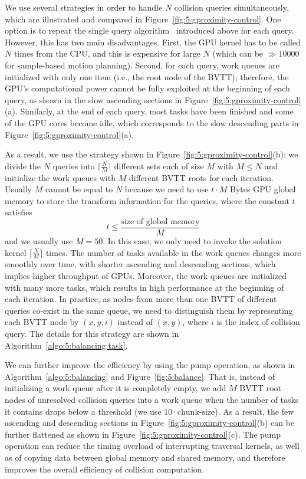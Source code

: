 We use several strategies in order to handle $N$ collision queries simultaneously, which are illustrated and compared in Figure~\ref{fig:5:gproximity-control}. One option is to repeat the single query algorithm~\cite{Lauterbach10} introduced above for each query. However, this has two main disadvantages. First, the GPU kernel has to be called $N$ times from the CPU, and this is expensive for large $N$ (which can be $\gg 10000$ for sample-based motion planning). Second, for each query, work queues are initialized with only one item (i.e., the root node of the BVTT); therefore, the GPU's computational power cannot be fully exploited at the beginning of each query, as shown in the slow ascending sections in Figure~\ref{fig:5:gproximity-control}(a). Similarly, at the end of each query, most tasks have been finished and some of the GPU cores become idle, which corresponds to the slow descending parts in Figure~\ref{fig:5:gproximity-control}(a).

As a result, we use the strategy shown in Figure~\ref{fig:5:gproximity-control}(b): we divide the $N$ queries into $\lceil\frac{N}{M}\rceil$ different sets each of size $M$ with $M\leq N$ and initialize the work queues with $M$ different BVTT roots for each iteration. Usually $M$ cannot be equal to $N$ because we need to use $t \cdot M$ Bytes GPU global memory to store the transform information for the queries, where the constant $t$ satisfies $$t \leq \frac{\text{size of global memory}}{M}$$ and we usually use $M=50$. In this case, we only need to invoke the solution kernel $\lceil\frac{N}{M}\rceil$ times. The number of tasks available in the work queues changes more smoothly over time, with shorter ascending and descending sections, which implies higher
throughput of GPUs. Moreover, the work queues are initialized with many more tasks, which results in high performance at the beginning of each iteration. In practice, as nodes from more than one BVTT of different queries co-exist in the same queue, we need to distinguish them by representing each BVTT node by $(x,y,i)$ instead of $(x,y)$, where $i$ is the index of collision query. The details for this strategy are shown in Algorithm~\ref{algo:5:balancing:task}.

We can further improve the efficiency by using the pump operation, as shown in Algorithm~\ref{algo:5:balancing} and Figure~\ref{fig:5:balance}. That is, instead of initializing a work queue after it is completely empty, we add $M$ BVTT root nodes of unresolved collision queries into a work queue when the number of tasks it contains drops below a threshold (we use $10\cdot \text{chunk-size}$). As a result, the few ascending and descending sections in Figure~\ref{fig:5:gproximity-control}(b) can be further flattened as shown in Figure~\ref{fig:5:gproximity-control}(c). The pump operation can reduce the timing overload of interrupting traversal kernels, as well as of copying data between global memory and shared memory, and therefore improves the overall efficiency of collision computation.


